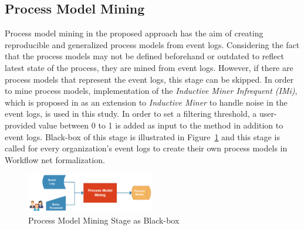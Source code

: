 \subsection{Process Model Mining}
\label{subsec:process-model-mining}
Process model mining in the proposed approach has the aim of creating reproducible and generalized process models from event logs. Considering the fact that the process models may not be defined beforehand or outdated to reflect latest state of the process, they are mined from event logs. However, if there are process models that represent the event logs, this stage can be skipped. In order to mine process models, implementation of the \textit{Inductive Miner Infrequent (IMi)}, which is proposed in \cite{leemans2014discoveringinfrequent} as an extension to \textit{Inductive Miner} to handle noise in the event logs, is used in this study. In order to set a filtering threshold, a user-provided value between 0 to 1 is added as input to the method in addition to event logs. Black-box of this stage is illustrated in Figure~\ref{fig:process-model-mining-blackbox} and this stage is called for every organization's event logs to create their own process models in Workflow net formalization.
\begin{figure}
  \centering
  \includegraphics[width=0.5\textwidth]{4_methodology/process-model-mining-blackbox}
  \caption{Process Model Mining Stage as Black-box }
  \label{fig:process-model-mining-blackbox}
\end{figure}

